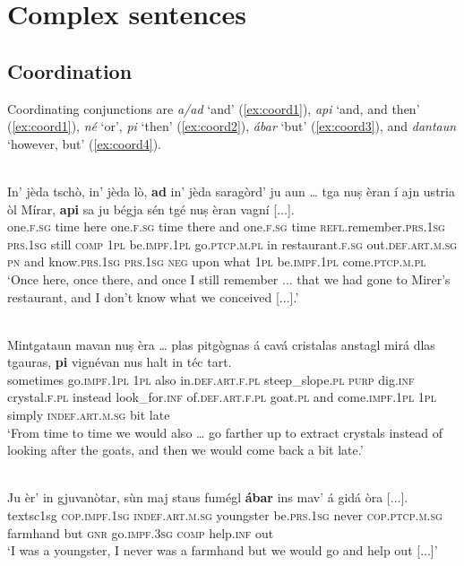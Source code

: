 \chapter{Complex sentences}

\section{Coordination}
Coordinating conjunctions are \textit{a/ad} `and' (\ref{ex:coord1}), \textit{api} `and, and then' (\ref{ex:coord1}), \textit{né} `or', \textit{pi} `then' (\ref{ex:coord2}), \textit{ábar} `but' (\ref{ex:coord3}), and \textit{dantaun} `however, but' (\ref{ex:coord4}).

\ea
\label{ex:coord1}
\\
\gll    In’ jèda tschò, in’ jèda lò, \textbf{ad} in’ jèda saragòrd’ ju aun … tga nuṣ èran í ajn ustria òl Mírar, \textbf{api} sa ju bégja sén tgé nuṣ èran vagní [...].\\
one.\textsc{f.sg} time here one.\textsc{f.sg} time there and one.\textsc{f.sg} time \textsc{refl}.remember.\textsc{prs.1sg} \textsc{prs.1sg} still {}  \textsc{comp} \textsc{1pl} be.\textsc{impf.1pl} go.\textsc{ptcp.m.pl} in restaurant.\textsc{f.sg} out.\textsc{def.art.m.sg} \textsc{pn} and  know.\textsc{prs.1sg} \textsc{prs.1sg} \textsc{neg} upon what \textsc{1pl} be.\textsc{impf.1pl} come.\textsc{ptcp.m.pl}\\
\glt `Once here, once there, and once I still remember ... that we had gone to Mirer's restaurant, and I don't know what we conceived [...].'
\z

\ea
\label{ex:coord2}
\\
\gll    Mintgataun mavan nuṣ èra … plas pitgògnas á cavá cristalas anstagl mirá dlas tgauras, \textbf{pi} vignévan nus halt in téc tart. \\
sometimes go.\textsc{impf.1pl} \textsc{1pl} also {} in.\textsc{def.art.f.pl} steep\_slope.\textsc{pl} \textsc{purp} dig.\textsc{inf} crystal.\textsc{f.pl} instead look\_for.\textsc{inf} of.\textsc{def.art.f.pl} goat.\textsc{pl} and come.\textsc{impf.1pl} \textsc{1pl} simply \textsc{indef.art.m.sg} bit late \\
\glt `From time to time we would also … go farther up to extract crystals instead of looking after the goats, and then we would come back a bit late.'
\z


\ea
\label{ex:coord3}
\\
\gll Ju èr’ in gjuvanòtar, sùn maj staus fumégl \textbf{ábar} ins mav’ á gidá òra [...].\\
textsc{1sg} \textsc{cop.impf.1sg} \textsc{indef.art.m.sg} youngster be.\textsc{prs.1sg} never \textsc{cop.ptcp.m.sg} farmhand but \textsc{gnr} go.\textsc{impf.3sg} \textsc{comp} help.\textsc{inf} out \\
\glt `I was a youngster, I never was a farmhand but we would go and help out [...]'
\z

